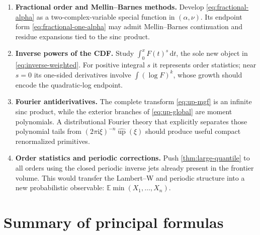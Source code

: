 \documentclass[11pt,oneside]{article}
\theoremstyle{definition}
\theoremstyle{remark}
\newcommand{\Up}{\operatorname{up}}
\newcommand{\E}{\mathbb E}
\newcommand{\dd}{\,\mathrm d}
\newcommand{\ii}{\mathrm i}
\newcommand{\1}{\mathbf 1}
\begin{document}
\begin{enumerate}
\item \textbf{Fractional order and Mellin--Barnes methods.}  Develop
\eqref{eq:fractional-alpha} as a two-complex-variable special function in
\((\alpha,\nu)\).  Its endpoint form \eqref{eq:fractional-one-alpha} may admit
Mellin--Barnes continuation and residue expansions tied to the sinc product.

\item \textbf{Inverse powers of the CDF.}  Study
\(\int_0^xF(t)^s\dd t\), the sole new object in
\eqref{eq:inverse-weighted}.  For positive integral \(s\) it represents order
statistics; near \(s=0\) its one-sided derivatives involve
\(\int(\log F)^k\), whose growth should encode the quadratic-log endpoint.

\item \textbf{Fourier antiderivatives.}  The complete transform
\eqref{eq:up-mgf} is an infinite sinc product, while the exterior branches of
\eqref{eq:up-global} are moment polynomials.  A distributional Fourier theory
that explicitly separates those polynomial tails from
\((2\pi\ii\xi)^{-n}\widehat{\Up}(\xi)\) should produce useful compact
renormalized primitives.

\item \textbf{Order statistics and periodic corrections.}  Push
\cref{thm:large-quantile} to all orders using the closed periodic inverse jets
already present in the frontier volume.  This would transfer the Lambert--W
and periodic structure into a new probabilistic observable:
\(\E\min(X_1,\ldots,X_n)\).
\end{enumerate}

\section{Summary of principal formulas}
\end{document}
